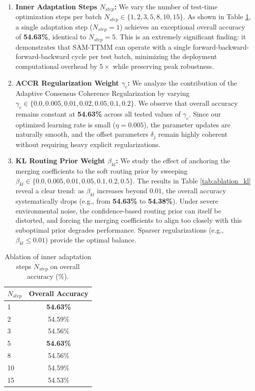 \documentclass{article}
\theoremstyle{plain}
\theoremstyle{definition}
\theoremstyle{remark}
\begin{document}
\begin{enumerate}
    \item \textbf{Inner Adaptation Steps $N_{step}$:} We vary the number of test-time optimization steps per batch $N_{step} \in \{1, 2, 3, 5, 8, 10, 15\}$. As shown in Table \ref{tab:ablation_nstep}, a single adaptation step ($N_{step}=1$) achieves an exceptional overall accuracy of \textbf{54.63\%}, identical to $N_{step}=5$. This is an extremely significant finding: it demonstrates that SAM-TTMM can operate with a single forward-backward-forward-backward cycle per test batch, minimizing the deployment computational overhead by $5\times$ while preserving peak robustness.
    \item \textbf{ACCR Regularization Weight $\gamma_c$:} We analyze the contribution of the Adaptive Consensus Coherence Regularization by varying $\gamma_c \in \{0.0, 0.005, 0.01, 0.02, 0.05, 0.1, 0.2\}$. We observe that overall accuracy remains constant at \textbf{54.63\%} across all tested values of $\gamma_c$. Since our optimized learning rate is small ($\eta = 0.005$), the parameter updates are naturally smooth, and the offset parameters $\delta_j$ remain highly coherent without requiring heavy explicit regularizations.
    \item \textbf{KL Routing Prior Weight $\beta_{kl}$:} We study the effect of anchoring the merging coefficients to the soft routing prior by sweeping $\beta_{kl} \in \{0.0, 0.005, 0.01, 0.05, 0.1, 0.2, 0.5\}$. The results in Table \ref{tab:ablation_kl} reveal a clear trend: as $\beta_{kl}$ increases beyond $0.01$, the overall accuracy systematically drops (e.g., from \textbf{54.63\%} to \textbf{54.38\%}). Under severe environmental noise, the confidence-based routing prior can itself be distorted, and forcing the merging coefficients to align too closely with this suboptimal prior degrades performance. Sparser regularizations (e.g., $\beta_{kl} \le 0.01$) provide the optimal balance.
\end{enumerate}

\begin{table}[h]
\caption{Ablation of inner adaptation steps $N_{step}$ on overall accuracy (\%).}
\label{tab:ablation_nstep}
\vskip 0.15in
\begin{center}
\begin{small}
\begin{sc}
\begin{tabular}{lc}
\toprule
$N_{step}$ & Overall Accuracy \\
\midrule
1 & \textbf{54.63\%} \\
2 & 54.59\% \\
3 & 54.56\% \\
5 & \textbf{54.63\%} \\
8 & 54.56\% \\
10 & 54.59\% \\
15 & 54.53\% \\
\bottomrule
\end{tabular}
\end{sc}
\end{small}
\end{center}
\vskip -0.1in
\end{table}
\end{document}

